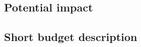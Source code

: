 \documentclass{article}
\begin{document}
\subsection{Potential impact}


\subsection{Short budget description}




\end{document}
